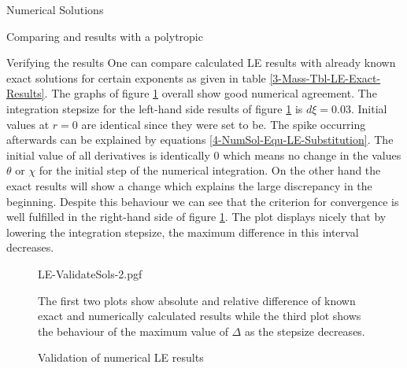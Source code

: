 \begin{section}{Numerical Solutions}
\begin{subsection}{Comparing  and  results with a polytropic }
\begin{figure}[H]
\end{figure}
\end{subsection}
%
%
\begin{subsection}{Verifying the results}
\label{4-NumSol-Sec-Verifiying-the-results}
One can compare calculated \ac{LE} results with already known exact  solutions for certain exponents as given in table \ref{3-Mass-Tbl-LE-Exact-Results}.
The graphs of figure \ref{4-NumSol-Plt-ValidateLEResults} overall show good numerical agreement.
The integration stepsize for the left-hand side results of figure \ref{4-NumSol-Plt-ValidateLEResults} is $d\xi=0.03$.
Initial values at $r=0$ are identical since they were set to be.
The spike occurring afterwards can be explained by equations \eqref{4-NumSol-Equ-LE-Substitution}.
The initial value of all derivatives is identically $0$ which means no change in the values $\theta$ or $\chi$ for the initial step of the numerical integration.
On the other hand the exact results will show a change which explains the large discrepancy in the beginning.
Despite this behaviour we can see that the criterion for convergence is well fulfilled in the right-hand side of figure \ref{4-NumSol-Plt-ValidateLEResults}.
The plot displays nicely that by lowering the integration stepsize, the maximum difference in this interval decreases.
\begin{figure}[H]
	\centering
	{LE-ValidateSols-2.pgf}
	\caption{Validation of numerical LE results}
	The first two plots show absolute and relative difference of known exact and numerically calculated results while the third plot shows the behaviour of the maximum value of $\Delta$ as the stepsize decreases.
	\label{4-NumSol-Plt-ValidateLEResults}
\end{figure}\noindent

\end{subsection}
\end{section}
